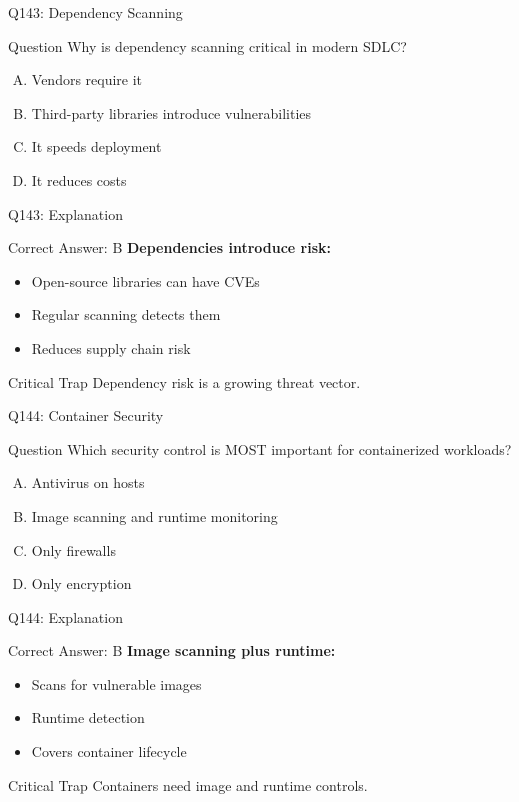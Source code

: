 \documentclass{beamer}
\begin{document}
	\begin{frame}{Q143: Dependency Scanning}
		\begin{block}{Question}
			Why is dependency scanning critical in modern SDLC?
		\end{block}
		\begin{enumerate}[(A)]
			\item Vendors require it
			\item Third-party libraries introduce vulnerabilities
			\item It speeds deployment
			\item It reduces costs
		\end{enumerate}
	\end{frame}
	
	\begin{frame}{Q143: Explanation}
		\begin{block}{Correct Answer: B}
			\textbf{Dependencies introduce risk:}
			\begin{itemize}
				\item Open-source libraries can have CVEs
				\item Regular scanning detects them
				\item Reduces supply chain risk
			\end{itemize}
		\end{block}
		\begin{alertblock}{Critical Trap}
			Dependency risk is a growing threat vector.
		\end{alertblock}
	\end{frame}
	
	\begin{frame}{Q144: Container Security}
		\begin{block}{Question}
			Which security control is MOST important for containerized workloads?
		\end{block}
		\begin{enumerate}[(A)]
			\item Antivirus on hosts
			\item Image scanning and runtime monitoring
			\item Only firewalls
			\item Only encryption
		\end{enumerate}
	\end{frame}
	
	\begin{frame}{Q144: Explanation}
		\begin{block}{Correct Answer: B}
			\textbf{Image scanning plus runtime:}
			\begin{itemize}
				\item Scans for vulnerable images
				\item Runtime detection
				\item Covers container lifecycle
			\end{itemize}
		\end{block}
		\begin{alertblock}{Critical Trap}
			Containers need image and runtime controls.
		\end{alertblock}
	\end{frame}
	
\end{document}
